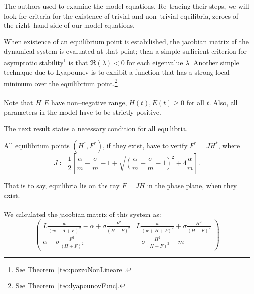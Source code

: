 The authors used  to examine the model equations.
Re--tracing their steps, we will look for criteria for the existence of trivial and non--trivial equilibria, \ie zeroes of the right--hand side of our model equations.

When existence of an equilibrium point is estabilished, the jacobian matrix of the dynamical system is
evaluated at that point; then a simple sufficient criterion for asymptotic
stability\footnote{See Theorem~\ref{teo:pozzoNonLineare}.}
is that $\Re (\lambda) < 0$ for each eigenvalue $\lambda$.
Another simple technique due to Lyapounov is to exhibit a function that has a strong local minimum
over the equilibrium point.\footnote{See Theorem~\ref{teo:lyapounovFunc}.}

\paragraph{}
Note that $H, E$ have non--negative range, \ie $H(t), E(t) \geq 0$ for all $t$.
Also, all parameters in the model have to be strictly positive.

The next result states a necessary condition for all equilibria.

\begin{lemma}
    \label{lem:necessJ}
    All equilibrium points $(H^*, F^*)$, if they exist, have to verify $F^* = J H^*$, where
    \begin{equation}
        J \coloneq \frac{1}{2} \left[
            \frac{\alpha}{m} - \frac{\sigma}{m} - 1 +
            \sqrt{ {\left( \frac{\alpha}{m} - \frac{\sigma}{m} - 1 \right)}^2
                + 4 \frac{\alpha}{m}
            }
        \right].
        \label{eq:kh11posEqJ}
    \end{equation}
\end{lemma}

That is to say, equilibria lie on the ray $F= JH$ in the phase plane, when they exist.

\paragraph{}
We calculated the jacobian matrix of this system as:
\begin{equation}
    \begin{pmatrix}
        L \frac{w}{{(w + H + F)}^2} - \alpha + \sigma \frac{F^2}{{(H+F)}^2} &
        L \frac{w}{{(w + H + F)}^2} + \sigma \frac{H^2}{{(H+F)}^2}
        \\
        \alpha - \sigma \frac{F^2}{{(H+F)}^2} &
        - \sigma \frac{H^2}{{(H+F)}^2} - m
    \end{pmatrix}
    \label{eq:jacoGeneral}
\end{equation}

